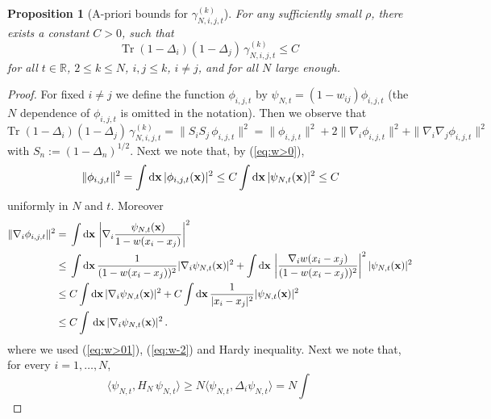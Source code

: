 \documentclass[11pt]{article}
\newtheorem{proposition}[theorem]{Proposition}
\newcommand{\rd}{{\rm d}}
\newcommand{\bx}{{\bf x}}
\newcommand{\bR}{{\mathbb R}}
\newcommand{\tr}{\mbox{Tr}}
\begin{document}
\begin{proposition}[A-priori bounds for $
\gamma^{(k)}_{N,i,j,t}$]\label{prop:apriori-phiij} For any
sufficiently small $\rho$, there exists a constant $C > 0$, such
that
\begin{equation}
\tr \; (1-\Delta_i) (1-\Delta_j) \, \gamma_{N,i,j,t}^{(k)} \leq C
\end{equation}
for all $t \in \bR$, $2 \leq k \leq N$, $i,j \leq k$, $i \neq j$,
and for all $N$ large enough.
\end{proposition}
\begin{proof}
For fixed $i\neq j$ we define the function
$\phi_{i,j,t}$ by $\psi_{N,t}
 = (1-w_{ij}) \phi_{i,j,t} $ (the $N$ dependence of
$\phi_{i,j,t}$ is omitted in the notation). Then we observe that
\begin{equation}\label{eq:apriori-phiij-1}
\tr \; (1-\Delta_i) (1-\Delta_j) \, \gamma_{N,i,j,t}^{(k)} = \| S_i
S_j \, \phi_{i,j,t} \|^2 = \| \phi_{i,j,t} \|^2 + 2 \| \nabla_i
\phi_{i,j,t} \|^2 + \| \nabla_i \nabla_j \phi_{i,j,t}\|^2
\end{equation}
with $S_n := (1-\Delta_n)^{1/2}$. Next we note that, by
(\ref{eq:w>0}),
\begin{equation}\label{eq:apriori-phiij-2}
\| \phi_{i,j,t} \|^2 = \int \rd \bx \, |\phi_{i,j,t} (\bx) |^2 \leq
C \int \rd \bx \, |\psi_{N,t} (\bx)|^2 \leq C
\end{equation}
uniformly in $N$ and $t$. Moreover
\begin{equation}\label{eq:nablapsi}
\begin{split}
\| \nabla_i \phi_{i,j,t} \|^2 = \; &\int \rd \bx \, \left| \nabla_i
\frac{\psi_{N,t} (\bx)}{1-w(x_i-x_j)} \right|^2 \\ \leq \; & \int
\rd \bx \, \frac{1}{(1-w(x_i-x_j))^2} |\nabla_i \psi_{N,t} (\bx)|^2
+ \int \rd \bx \, \left|\frac{\nabla_i w(x_i
-x_j)}{(1-w(x_i-x_j))^2}\right|^2 | \psi_{N,t} (\bx)|^2 \\ \leq \;
&C \int \rd \bx \, |\nabla_i  \psi_{N,t} (\bx)|^2 + C \int \rd \bx
\, \frac{1}{|x_i -x_j|^2} | \psi_{N,t} (\bx)|^2
\\ \leq \; &C \int \, \rd \bx \, |\nabla_i \psi_{N,t}(\bx) |^2 \,.
\end{split}
\end{equation}
where we used (\ref{eq:w>01}), (\ref{eq:w-2}) and Hardy inequality.
Next we note that, for every $i=1,\dots,N$,
\begin{equation}
\langle \psi_{N,t}, H_N \,   \psi_{N,t} \rangle \geq N \langle
\psi_{N,t}, \Delta_i  \psi_{N,t} \rangle = N \int  \,

\end{equation}
\end{proof}
\end{document}
